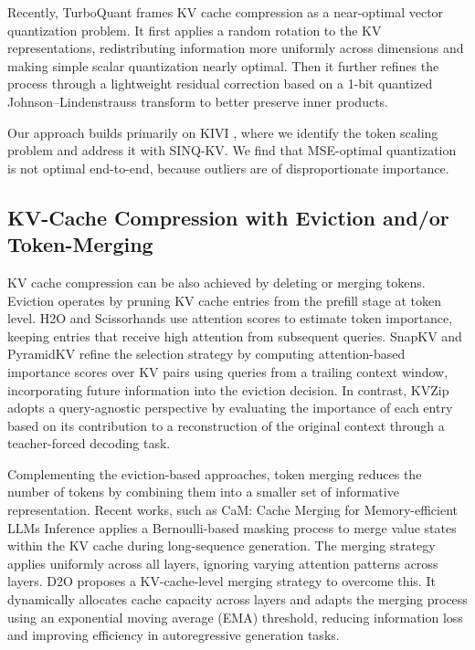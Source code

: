 \documentclass{llmxive}
\providecommand{\methodname}{SINQ-KV\xspace}
\begin{document}
Recently, TurboQuant \cite{zandieh2026turboquant} frames KV cache compression as a near-optimal vector quantization problem. It first applies a random rotation to the KV representations, redistributing information more uniformly across dimensions and making simple scalar quantization nearly optimal. Then it further refines the process through a lightweight residual correction based on a 1-bit quantized Johnson–Lindenstrauss transform to better preserve inner products. 

Our approach builds primarily on KIVI \cite{KIVI}, where we identify the token scaling problem and address it with \methodname. We  find that MSE-optimal quantization is not optimal end-to-end, because outliers are of disproportionate importance. 


\subsection{KV-Cache Compression with Eviction and/or Token-Merging}
KV cache compression can be also achieved by deleting or merging tokens. Eviction operates by pruning KV cache entries from the prefill stage at token level. H2O \cite{NEURIPS2023_6ceefa7b_H2O} and Scissorhands \cite{NEURIPS2023_a452a7c6_scissorhands} use attention scores to estimate token importance, keeping entries that receive high attention from subsequent queries. SnapKV \cite{NEURIPS2024_28ab4182_SnapKV} and PyramidKV \cite{cai2025pyramidkv} refine the selection strategy by computing attention-based importance scores over KV pairs using queries from a trailing context window, incorporating future information into the eviction decision. 
In contrast, KVZip \cite{kim2026kvzip} adopts a query-agnostic perspective by evaluating the importance of each entry based on its contribution to a reconstruction of the original context through a teacher-forced decoding task.

Complementing the eviction-based approaches, token merging reduces the number of tokens by combining them into a smaller set of informative representation. Recent works, such as CaM: Cache Merging for Memory-efficient LLMs Inference \cite{zhang2024cam} applies a Bernoulli-based masking process to merge value states within the KV cache during long-sequence generation. The merging strategy applies uniformly across all layers, ignoring varying attention patterns across layers.
D2O \cite{wan2025textdtexto_d2o} proposes a KV-cache-level merging strategy to overcome this. It dynamically allocates cache capacity across layers and adapts the merging process using an exponential moving average (EMA) threshold, reducing information loss and improving efficiency in autoregressive generation tasks.
\end{document}
